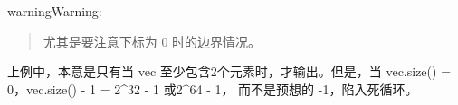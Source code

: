 \documentclass[letterpaper,10pt,english]{sphinxmanual}
\begin{document}
\begin{sphinxadmonition}{warning}{Warning:}\begin{quote}

 尤其是要注意下标为 0 时的边界情况。

%
\begin{sphinxVerbatim}[commandchars=\\\{\},numbers=left,firstnumber=1,stepnumber=1]
  
          
    \PYG{p}{[}\PYG{p}{]}  \PYG{p}{[}\PYG{p}{]}  
\end{sphinxVerbatim}
\end{quote}

上例中，本意是只有当 vec 至少包含2个元素时，才输出。但是，当 vec.size() = 0，vec.size() - 1 = 2\textasciicircum{}32 - 1 或2\textasciicircum{}64 - 1，
而不是预想的 -1，陷入死循环。
\end{sphinxadmonition}
\end{document}
